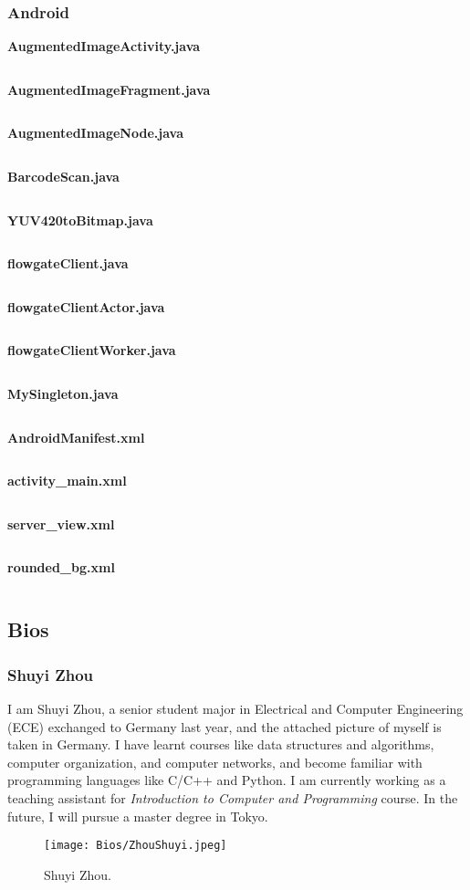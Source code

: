 \documentclass[11pt,a4paper]{article}
\begin{document}
\begin{onehalfspace}
\subsubsection{Android}
\noindent\textbf{AugmentedImageActivity.java}
\inputminted{java}{Android/AugmentedImageActivity.java}
\noindent\textbf{AugmentedImageFragment.java}
\inputminted{java}{Android/AugmentedImageFragment.java}
\noindent\textbf{AugmentedImageNode.java}
\inputminted{java}{Android/AugmentedImageNode.java}
\noindent\textbf{BarcodeScan.java}
\inputminted{java}{Android/BarcodeScan.java}
\noindent\textbf{YUV420toBitmap.java}
\inputminted{java}{Android/YUV420toBitmap.java}
\noindent\textbf{flowgateClient.java}
\inputminted{java}{Android/flowgateClient.java}
\noindent\textbf{flowgateClientActor.java}
\inputminted{java}{Android/flowgateClientActor.java}
\noindent\textbf{flowgateClientWorker.java}
\inputminted{java}{Android/flowgateClientWorker.java}
\noindent\textbf{MySingleton.java}
\inputminted{java}{Android/MySingleton.java}
\noindent\textbf{AndroidManifest.xml}
\inputminted{xml}{Android/AndroidManifest.xml}
\noindent\textbf{activity\_main.xml}
\inputminted{xml}{Android/activity_main.xml}
\noindent\textbf{server\_view.xml}
\inputminted{xml}{Android/server_view.xml}
\noindent\textbf{rounded\_bg.xml}
\inputminted{xml}{Android/rounded_bg.xml}
\subsection{Bios}
\subsubsection{Shuyi Zhou}
I am Shuyi Zhou, a senior student major in Electrical and Computer Engineering (ECE) exchanged to Germany last year, and the attached picture of myself is taken in Germany. I have learnt courses like data structures and algorithms, computer organization, and computer networks, and become familiar with programming languages like C/C++ and Python. I am currently working as a teaching assistant for \textit{Introduction to Computer and Programming} course. In the future, I will pursue a master degree in Tokyo.
\begin{figure}[H]
	\centering
	\texttt{[image: Bios/ZhouShuyi.jpeg]}
	\caption{Shuyi Zhou.}
\end{figure} 

\end{onehalfspace}
\end{document}
